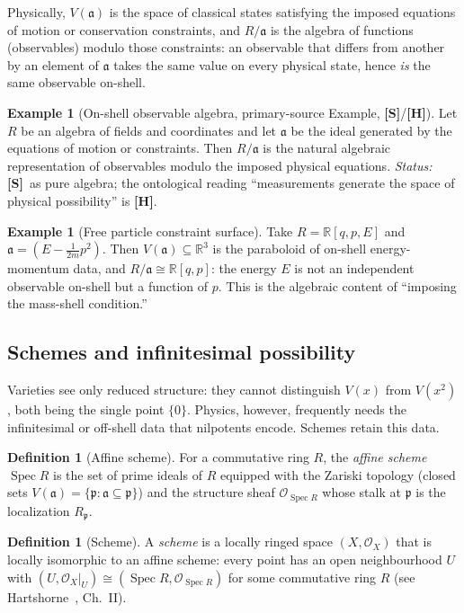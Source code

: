 \documentclass[12pt]{article}
\theoremstyle{definition}
\newtheorem{definition}[theorem]{Definition}
\newtheorem{example}[theorem]{Example}
\theoremstyle{remark}
\newcommand{\Spec}{\operatorname{Spec}}
\newcommand{\Ideal}{\mathfrak{a}}
\newcommand{\RR}{\mathbb{R}}
\newcommand{\Ohm}{\mathcal{O}}
\newcommand{\status}[1]{\textnormal{\textsf{\textbf{[#1]}}}}
\begin{document}
Physically, $V(\Ideal)$ is the space of classical states satisfying the imposed equations of motion or
conservation constraints, and $R/\Ideal$ is the algebra of functions (observables) modulo those
constraints: an observable that differs from another by an element of $\Ideal$ takes the same value on
every physical state, hence \emph{is} the same observable on-shell.

\begin{example}[On-shell observable algebra, primary-source Example, \status{S}/\status{H}]
\label{ex:onshell}
Let $R$ be an algebra of fields and coordinates and let $\Ideal$ be the ideal generated by the
equations of motion or constraints. Then $R/\Ideal$ is the natural algebraic representation of
observables modulo the imposed physical equations. \emph{Status:} \status{S}\ as pure algebra; the
ontological reading ``measurements generate the space of physical possibility'' is \status{H}.
\end{example}

\begin{example}[Free particle constraint surface]
Take $R=\RR[q,p,E]$ and $\Ideal=(E-\tfrac{1}{2m}p^2)$. Then $V(\Ideal)\subseteq \RR^3$ is the
paraboloid of on-shell energy-momentum data, and $R/\Ideal\cong \RR[q,p]$: the energy $E$ is not an
independent observable on-shell but a function of $p$. This is the algebraic content of ``imposing the
mass-shell condition.''
\end{example}

\subsection{Schemes and infinitesimal possibility}

Varieties see only reduced structure: they cannot distinguish $V(x)$ from $V(x^2)$, both being the
single point $\{0\}$. Physics, however, frequently needs the infinitesimal or off-shell data that
nilpotents encode. Schemes retain this data.

\begin{definition}[Affine scheme]
\label{def:affsch}
For a commutative ring $R$, the \emph{affine scheme} $\Spec R$ is the set of prime ideals of $R$
equipped with the Zariski topology (closed sets $V(\Ideal)=\{\mathfrak p : \Ideal\subseteq\mathfrak
p\}$) and the structure sheaf $\Ohm_{\Spec R}$ whose stalk at $\mathfrak p$ is the localization
$R_{\mathfrak p}$.
\end{definition}

\begin{definition}[Scheme]
\label{def:scheme}
A \emph{scheme} is a locally ringed space $(X,\Ohm_X)$ that is locally isomorphic to an affine scheme:
every point has an open neighbourhood $U$ with $(U,\Ohm_X|_U)\cong (\Spec R,\Ohm_{\Spec R})$ for some
commutative ring $R$ (see Hartshorne~\cite{hartshorne}, Ch.~II).
\end{definition}
\end{document}
